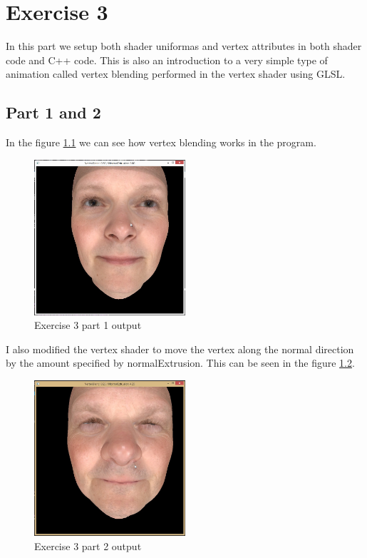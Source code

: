 \chapter{Exercise 3}
In this part we setup both shader uniformas and vertex attributes in both shader code and C++ code.
This is also an introduction to a very simple type of animation called vertex blending performed in
the vertex shader using GLSL.

\section{Part 1 and 2}
In the figure \ref{fig:exercise_3_part_1} we can see how vertex blending works in the program.

\begin{figure}[ht!]
	\begin{center}
		\includegraphics[width=0.5\textwidth]{figures/exercise_3_part_1}
	\end{center}
	\vspace{-4.5ex}\caption{Exercise 3 part 1 output}
	\label{fig:exercise_3_part_1} 
\end{figure}
I also modified the vertex shader to move the vertex along the normal direction by the amount specified
by normalExtrusion. This can be seen in the figure \ref{fig:exercise_3_part_2}.
\clearpage
\begin{figure}[ht!]
	\begin{center}
		\includegraphics[width=0.5\textwidth]{figures/exercise_3_part_2}
	\end{center}
	\vspace{-4.5ex}\caption{Exercise 3 part 2 output}
	\label{fig:exercise_3_part_2} 
\end{figure}

